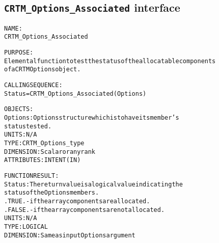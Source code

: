 \subsection{\texttt{CRTM\_Options\_Associated} interface}
  \label{sec:CRTM_Options_Associated_interface}
  \begin{alltt}
 
  NAME:
        CRTM_Options_Associated
 
  PURPOSE:
        Elemental function to test the status of the allocatable components
        of a CRTM Options object.
 
  CALLING SEQUENCE:
        Status = CRTM_Options_Associated( Options )
 
  OBJECTS:
        Options:      Options structure which is to have its member's
                      status tested.
                      UNITS:      N/A
                      TYPE:       CRTM_Options_type
                      DIMENSION:  Scalar or any rank
                      ATTRIBUTES: INTENT(IN)
 
  FUNCTION RESULT:
        Status:       The return value is a logical value indicating the
                      status of the Options members.
                        .TRUE.  - if the array components are allocated.
                        .FALSE. - if the array components are not allocated.
                      UNITS:      N/A
                      TYPE:       LOGICAL
                      DIMENSION:  Same as input Options argument
 
  \end{alltt}
